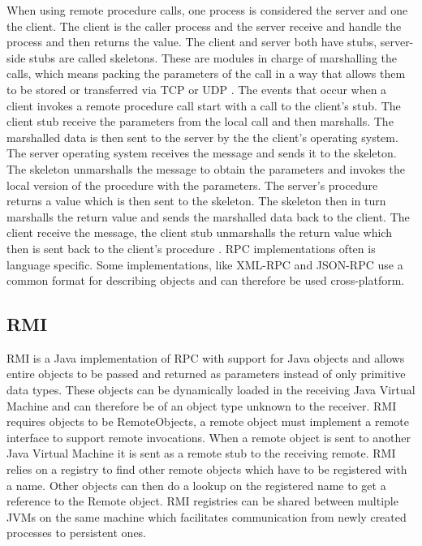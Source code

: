 When using remote procedure calls, one process is considered the server and one the client. The client is the caller process and the server receive and handle the process and then returns the value. The client and server both have stubs, server-side stubs are called skeletons. These are modules in charge of marshalling the calls, which means packing the parameters of the call in a way that allows them to be stored or transferred via TCP or UDP \cite{rfc5531}. 
The events that occur when a client invokes a remote procedure call start with a call to the client's stub. The client stub receive the parameters from the local call and then marshalls. The marshalled data is then sent to the server by the the client's operating system. The server operating system receives the message and sends it to the skeleton. The skeleton unmarshalls the message  to obtain the parameters and invokes the local version of the procedure with the parameters. The server's procedure returns a value which is then sent to the skeleton. The skeleton then in turn marshalls the return value and sends the marshalled data back to the client. The client receive the message, the client stub unmarshalls the return value which then is sent back to the client's procedure \cite{Lewandowski97interprocesscommunication}. RPC implementations often is language specific. Some implementations, like XML-RPC and 
JSON-RPC use a common format for describing objects and can therefore be used cross-platform.

\subsection{RMI}
RMI is a Java implementation of RPC with support for Java objects and allows entire objects to be passed and returned as parameters instead of only primitive data types. These objects can be dynamically loaded in the receiving Java Virtual Machine and can therefore be of an object type unknown to the receiver. RMI requires objects to be RemoteObjects, a remote object must implement a remote interface to support remote invocations. When a remote object is sent to another Java Virtual Machine it is sent as a remote stub to the receiving remote.
RMI relies on a registry to find other remote objects which have to be registered with a name. Other objects can then do a lookup on the registered name to get a reference to the Remote object. RMI registries can be shared between multiple JVMs on the same machine which facilitates communication from newly created processes to persistent ones.

